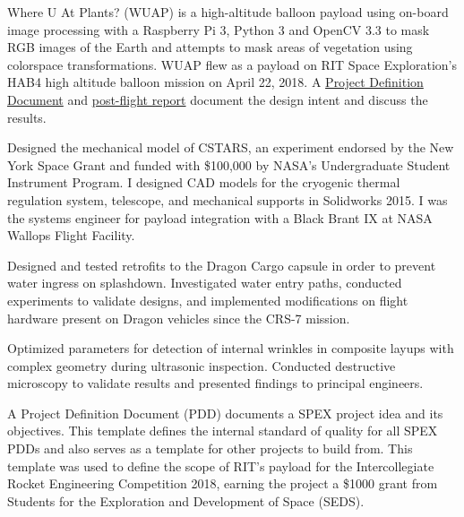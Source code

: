 \documentclass[10pt,final,sans]{resume}
\begin{document}
Where U At Plants? (WUAP) is a high-altitude balloon payload using on-board
image processing with a Raspberry Pi 3, Python 3 and OpenCV 3.3 to mask RGB
images of the Earth and attempts to mask areas of vegetation using colorspace
transformations. WUAP flew as a payload on RIT Space Exploration's HAB4 high
altitude balloon mission on April 22, 2018. A
\href{https://github.com/RIT-Space-Exploration/hab-cv/blob/master/reports/Project%20Definition%20Document/hab-cv.pdf}{Project
Definition Document} and
\href{https://github.com/RIT-Space-Exploration/hab-cv/blob/master/reports/HAB4%20Post%20Flight%20Report/report_wuap_postflight-hab4.md}{post-flight
report} document the design intent and discuss the results.

Designed the mechanical model of CSTARS, an experiment endorsed by the New York
Space Grant and funded with \$100,000 by NASA's Undergraduate Student Instrument
Program. I designed CAD models for the cryogenic thermal regulation system,
telescope, and mechanical supports in Solidworks 2015. I was the systems
engineer for payload integration with a Black Brant IX at NASA Wallops Flight
Facility.

Designed and tested retrofits to the Dragon Cargo capsule in order to prevent
water ingress on splashdown. Investigated water entry paths, conducted
experiments to validate designs, and implemented modifications on flight
hardware present on Dragon vehicles since the CRS-7 mission.

Optimized parameters for detection of internal wrinkles in composite layups
with complex geometry during ultrasonic inspection. Conducted destructive
microscopy to validate results and presented findings to principal engineers.

A Project Definition Document (PDD) documents a SPEX project idea and its
objectives. This template defines the internal standard of quality for all SPEX
PDDs and also serves as a template for other projects to build from. This
template was used to define the scope of RIT's payload for the Intercollegiate
Rocket Engineering Competition 2018, earning the project a \$1000 grant from
Students for the Exploration and Development of Space (SEDS).
\end{document}
